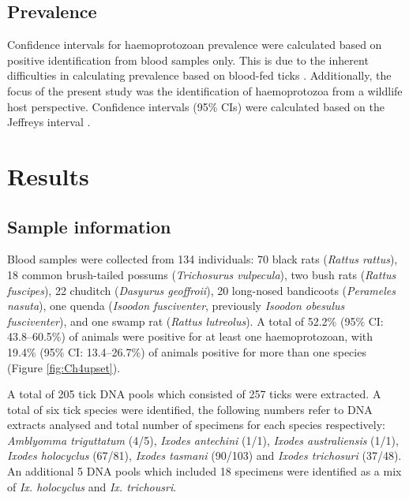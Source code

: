 \documentclass[a4paper, nobind]{templates/ociamthesis}
\begin{document}
\hypertarget{prevalence}{%
\subsection{Prevalence}\label{prevalence}}

Confidence intervals for haemoprotozoan prevalence were calculated based on positive identification from blood samples only.
This is due to the inherent difficulties in calculating prevalence based on blood-fed ticks \autocite{estrada-penaPitfallsTickTickBorne2021}.
Additionally, the focus of the present study was the identification of haemoprotozoa from a wildlife host perspective.
Confidence intervals (95\% CIs) were calculated based on the Jeffreys interval \autocite{brownIntervalEstimationBinomial2001}.

\hypertarget{results-1}{%
\section{Results}\label{results-1}}

\hypertarget{sample-information}{%
\subsection{Sample information}\label{sample-information}}

Blood samples were collected from 134 individuals: 70 black rats (\emph{Rattus rattus}), 18 common brush-tailed possums (\emph{Trichosurus vulpecula}), two bush rats (\emph{Rattus fuscipes}), 22 chuditch (\emph{Dasyurus geoffroii}), 20 long-nosed bandicoots (\emph{Perameles nasuta}), one quenda (\emph{Isoodon fusciventer}, previously \emph{Isoodon obesulus fusciventer}), and one swamp rat (\emph{Rattus lutreolus}).
A total of 52.2\% (95\% CI: 43.8--60.5\%) of animals were positive for at least one haemoprotozoan, with 19.4\% (95\% CI: 13.4--26.7\%) of animals positive for more than one species (Figure \ref{fig:Ch4upset}).

A total of 205 tick DNA pools which consisted of 257 ticks were extracted.
A total of six tick species were identified, the following numbers refer to DNA extracts analysed and total number of specimens for each species respectively: \emph{Amblyomma triguttatum} (4/5), \emph{Ixodes antechini} (1/1), \emph{Ixodes australiensis} (1/1), \emph{Ixodes holocyclus} (67/81), \emph{Ixodes tasmani} (90/103) and \emph{Ixodes trichosuri} (37/48). An additional 5 DNA pools which included 18 specimens were identified as a mix of \emph{Ix. holocyclus} and \emph{Ix. trichousri}.
\end{document}
